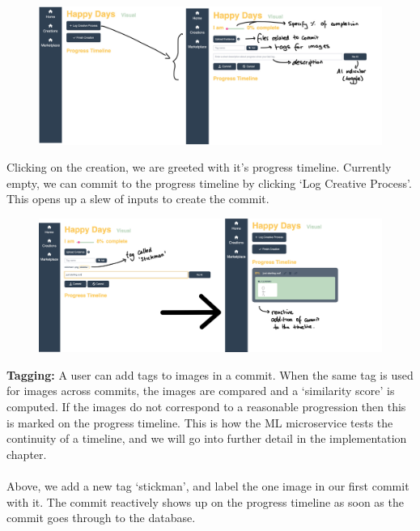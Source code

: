 \documentclass[12pt,a4paper]{article}
\begin{document}
\begin{figure}[H]
    \centering
    \includegraphics[scale=0.35]{creation.png}
\end{figure}

\noindent Clicking on the creation, we are greeted with it's progress timeline. Currently empty, we can commit to the progress timeline by clicking `Log Creative Process'. This opens up a slew of inputs to create the commit.


\begin{figure}[H]
    \centering
    \includegraphics[scale=0.35]{tagging1.png}
\end{figure}
\noindent\textbf{Tagging:} A user can add tags to images in a commit. When the same tag is used for images across commits, the images are compared and a `similarity score' is computed. If the images do not correspond to a reasonable progression then this is marked on the progress timeline. This is how the ML microservice tests the continuity of a timeline, and we will go into further detail in the implementation chapter.\\\\Above, we add a new tag `stickman', and label the one image in our first commit with it. The commit reactively shows up on the progress timeline as soon as the commit goes through to the database. 
\end{document}
